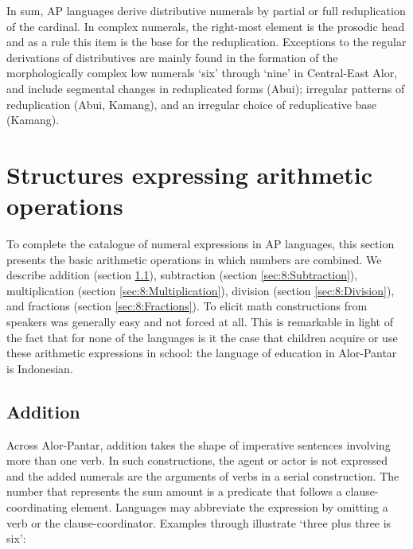 In sum, AP languages derive distributive numerals by partial or full reduplication of the cardinal. In complex numerals, the right-most element is the prosodic head and as a rule this item is the base for the reduplication. Exceptions to the regular derivations of distributives are mainly found in the formation of the morphologically complex low numerals `six' through `nine' in Central-East Alor, and include segmental changes in reduplicated forms (Abui); irregular patterns of reduplication (Abui, Kamang), and an irregular choice of reduplicative base (Kamang). 

\section{Structures expressing arithmetic operations} 
\label{sec:8:Structures}
To complete the catalogue of numeral expressions in AP languages, this section presents the basic arithmetic operations in which numbers are combined. We describe addition (section \ref{sec:8:Addition}), subtraction (section \ref{sec:8:Subtraction}), multiplication (section \ref{sec:8:Multiplication}), division (section \ref{sec:8:Division}), and fractions (section \ref{sec:8:Fractions}). To elicit math constructions from speakers was generally easy and not forced at all. This is remarkable in light of the fact that for none of the languages is it the case that children acquire or use these arithmetic expressions in school: the language of education in Alor-Pantar is Indonesian. 

\subsection{Addition}
\label{sec:8:Addition}
Across Alor-Pantar, addition takes the shape of imperative sentences involving more than one verb. In such constructions, the agent or actor is not expressed and the added numerals are the arguments of verbs in a serial construction. The number that represents the sum amount is a predicate that follows a clause-coordinating element. Languages may abbreviate the expression by omitting a verb or the clause-coordinator. Examples  through  illustrate `three plus three is six':


\ea%
\label{bkm:Ref342663714}
\\
 
